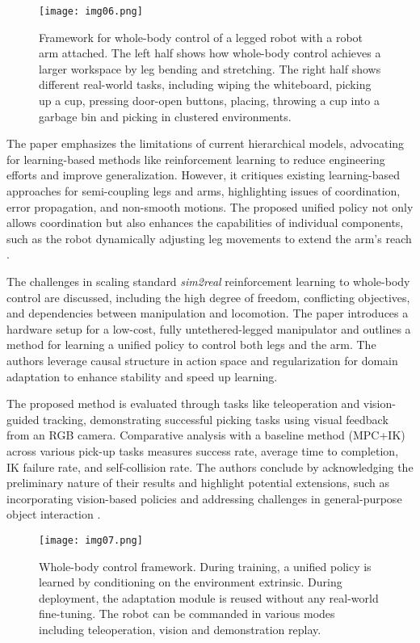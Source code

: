 \begin{figure}[ht]
	\centering
	\texttt{[image: img06.png]}
	\captionsetup{width=1\linewidth}
	\caption{Framework for whole-body control of a legged robot with a robot arm attached.
		The left half shows how whole-body control achieves a larger workspace by leg bending and stretching.
		The right half shows different real-world tasks, including wiping the whiteboard, picking up a cup,
		pressing door-open buttons, placing, throwing a cup into a garbage bin and picking
		in clustered environments. \cite{fu2022deeplegged}}
	\label{fig:img06}
\end{figure}

The paper emphasizes the limitations of current hierarchical models, advocating for learning-based
methods like reinforcement learning to reduce engineering efforts and improve generalization.
However, it critiques existing learning-based approaches for semi-coupling legs and arms,
highlighting issues of coordination, error propagation, and non-smooth motions.
The proposed unified policy not only allows coordination but also enhances the capabilities
of individual components, such as the robot dynamically adjusting leg movements to extend
the arm's reach \cite{fu2022deeplegged}.

The challenges in scaling standard \textit{sim2real} reinforcement learning to whole-body control
are discussed, including the high degree of freedom, conflicting objectives, and dependencies
between manipulation and locomotion. The paper introduces a hardware setup for a low-cost, fully
untethered-legged manipulator and outlines a method for learning a unified policy to control
both legs and the arm. The authors leverage causal structure in action space and regularization
for domain adaptation to enhance stability and speed up learning.

The proposed method is evaluated through tasks like teleoperation and vision-guided tracking,
demonstrating successful picking tasks using visual feedback from an RGB camera.
Comparative analysis with a baseline method (MPC+IK) across various pick-up tasks measures success rate,
average time to completion, IK failure rate, and self-collision rate.
The authors conclude by acknowledging the preliminary nature of their results and highlight
potential extensions, such as incorporating vision-based policies and addressing challenges
in general-purpose object interaction \cite{fu2022deeplegged}.

\begin{figure}[ht]
	\centering
	\texttt{[image: img07.png]}
	\captionsetup{width=1\linewidth}
	\caption{Whole-body control framework. During training, a unified policy is learned by conditioning on
		the environment extrinsic. During deployment, the adaptation module is reused without
		any real-world fine-tuning.
		The robot can be commanded in various modes including teleoperation, vision and demonstration replay.
		\cite{fu2022deeplegged}}
	\label{fig:img07}
\end{figure}

